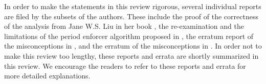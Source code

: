 In order to make the statements in this review rigorous, several
individual reports are filed by the subsets of the authors. These
include the proof \cite{ChenHuangNelissen} of the correctness of the
analysis from Jane W.S. Liu in her book \cite[Page
164-165]{Liu:2000:RS:518501}, the re-examination and the limitations
\cite{ChenBrandenburg} of the period enforcer algorithm proposed in
\cite{Raj:suspension1991}, the erratum report \cite{BletsasReport2015}
of the misconceptions in
\cite{ECRTS-AudsleyB04,RTAS-AudsleyB04,RTCSA-BletsasA05}, and the erratum \cite{Kim2016} of the
misconceptions in \cite{RTSS-KimANR13}.  In order not to make this
review too lengthy, these reports and errata are shortly summarized in
this review. We encourage the readers to refer to these reports and
errata for more detailed explanations.



